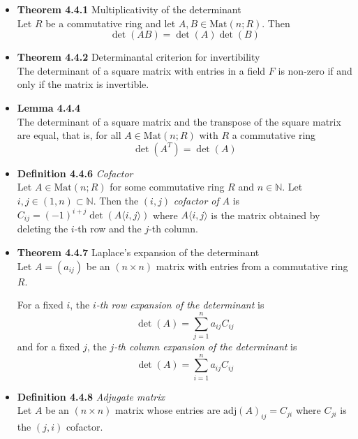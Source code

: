 \documentclass[11pt,a4paper]{article}
\begin{document}
\begin{itemize}
    \item \textbf{Theorem 4.4.1} Multiplicativity of the determinant \\
        Let $R$ be a commutative ring and let $A, B \in \mathrm{Mat}(n; R)$.
        Then
        \[
            \det(A B) = \det(A)\det(B)
        \]

    \item \textbf{Theorem 4.4.2} Determinantal criterion for invertibility \\
        The determinant of a square matrix with entries in a field $F$ is non-zero
        if and only if the matrix is invertible.

    \item \textbf{Lemma 4.4.4} \\
        The determinant of a square matrix and the transpose of the square matrix are equal,
        that is, for all $A \in \mathrm{Mat}(n; R)$ with $R$ a commutative ring
        \[
            \det(A^T) = \det(A)
        \]

    \item \textbf{Definition 4.4.6} \emph{Cofactor} \\
        Let $A \in \mathrm{Mat}(n; R)$ for some commutative ring $R$ and $n \in \mathbb{N}$.
        Let $i, j \in (1,n) \subset \mathbb{N}$.
        Then the $(i, j)$ \emph{cofactor of} $A$ is
        $C_{ij} = {(-1)}^{i+j} \det(A \langle i, j \rangle)$
        where $A \langle i, j \rangle$ is the matrix obtained by deleting the $i$-th row and
        the $j$-th column.

    \item \textbf{Theorem 4.4.7} Laplace's expansion of the determinant \\
        Let $A = (a_{ij})$ be an $(n \times n)$ matrix with entries from a commutative ring
        $R$.

        For a fixed $i$, the \emph{$i$-th row expansion of the determinant} is
        \[
            \det(A) = \sum_{j=1}^n a_{ij} C_{ij}
        \]
        and for a fixed $j$, the \emph{$j$-th column expansion of the determinant} is
        \[
            \det(A) = \sum_{i=1}^n a_{ij} C_{ij}
        \]

    \item \textbf{Definition 4.4.8} \emph{Adjugate matrix} \\
        Let $A$ be an $(n \times n)$ matrix whose entries are
        $\mathrm{adj}{
        (A)}_{ij} = C_{ji}$ where $C_{ji}$ is the $(j, i)$ cofactor.


\end{itemize}
\end{document}
